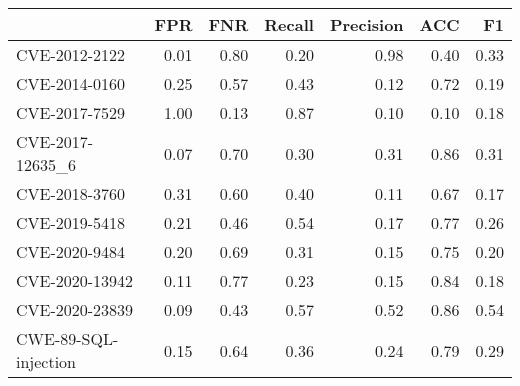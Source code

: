 \begin{tabular}{lrrrrrr}
\toprule
{} &  FPR &  FNR &  Recall &  Precision &  ACC &   F1 \\
\midrule
CVE-2012-2122        & 0.01 & 0.80 &    0.20 &       0.98 & 0.40 & 0.33 \\
CVE-2014-0160        & 0.25 & 0.57 &    0.43 &       0.12 & 0.72 & 0.19 \\
CVE-2017-7529        & 1.00 & 0.13 &    0.87 &       0.10 & 0.10 & 0.18 \\
CVE-2017-12635\_6     & 0.07 & 0.70 &    0.30 &       0.31 & 0.86 & 0.31 \\
CVE-2018-3760        & 0.31 & 0.60 &    0.40 &       0.11 & 0.67 & 0.17 \\
CVE-2019-5418        & 0.21 & 0.46 &    0.54 &       0.17 & 0.77 & 0.26 \\
CVE-2020-9484        & 0.20 & 0.69 &    0.31 &       0.15 & 0.75 & 0.20 \\
CVE-2020-13942       & 0.11 & 0.77 &    0.23 &       0.15 & 0.84 & 0.18 \\
CVE-2020-23839       & 0.09 & 0.43 &    0.57 &       0.52 & 0.86 & 0.54 \\
CWE-89-SQL-injection & 0.15 & 0.64 &    0.36 &       0.24 & 0.79 & 0.29 \\
\bottomrule
\end{tabular}
